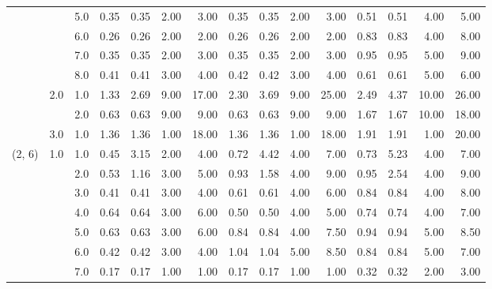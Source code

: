 \begin{tabular}{lllrrrrrrrrrrrr}
       &     & 5.0  &       0.35 &      0.35 & 2.00 &   3.00 &       0.35 &      0.35 &  2.00 &   3.00 &       0.51 &      0.51 &  4.00 &   5.00 \\
       &     & 6.0  &       0.26 &      0.26 & 2.00 &   2.00 &       0.26 &      0.26 &  2.00 &   2.00 &       0.83 &      0.83 &  4.00 &   8.00 \\
       &     & 7.0  &       0.35 &      0.35 & 2.00 &   3.00 &       0.35 &      0.35 &  2.00 &   3.00 &       0.95 &      0.95 &  5.00 &   9.00 \\
       &     & 8.0  &       0.41 &      0.41 & 3.00 &   4.00 &       0.42 &      0.42 &  3.00 &   4.00 &       0.61 &      0.61 &  5.00 &   6.00 \\
       & 2.0 & 1.0  &       1.33 &      2.69 & 9.00 &  17.00 &       2.30 &      3.69 &  9.00 &  25.00 &       2.49 &      4.37 & 10.00 &  26.00 \\
       &     & 2.0  &       0.63 &      0.63 & 9.00 &   9.00 &       0.63 &      0.63 &  9.00 &   9.00 &       1.67 &      1.67 & 10.00 &  18.00 \\
       & 3.0 & 1.0  &       1.36 &      1.36 & 1.00 &  18.00 &       1.36 &      1.36 &  1.00 &  18.00 &       1.91 &      1.91 &  1.00 &  20.00 \\
(2, 6) & 1.0 & 1.0  &       0.45 &      3.15 & 2.00 &   4.00 &       0.72 &      4.42 &  4.00 &   7.00 &       0.73 &      5.23 &  4.00 &   7.00 \\
       &     & 2.0  &       0.53 &      1.16 & 3.00 &   5.00 &       0.93 &      1.58 &  4.00 &   9.00 &       0.95 &      2.54 &  4.00 &   9.00 \\
       &     & 3.0  &       0.41 &      0.41 & 3.00 &   4.00 &       0.61 &      0.61 &  4.00 &   6.00 &       0.84 &      0.84 &  4.00 &   8.00 \\
       &     & 4.0  &       0.64 &      0.64 & 3.00 &   6.00 &       0.50 &      0.50 &  4.00 &   5.00 &       0.74 &      0.74 &  4.00 &   7.00 \\
       &     & 5.0  &       0.63 &      0.63 & 3.00 &   6.00 &       0.84 &      0.84 &  4.00 &   7.50 &       0.94 &      0.94 &  5.00 &   8.50 \\
       &     & 6.0  &       0.42 &      0.42 & 3.00 &   4.00 &       1.04 &      1.04 &  5.00 &   8.50 &       0.84 &      0.84 &  5.00 &   7.00 \\
       &     & 7.0  &       0.17 &      0.17 & 1.00 &   1.00 &       0.17 &      0.17 &  1.00 &   1.00 &       0.32 &      0.32 &  2.00 &   3.00 \\

\end{tabular}
